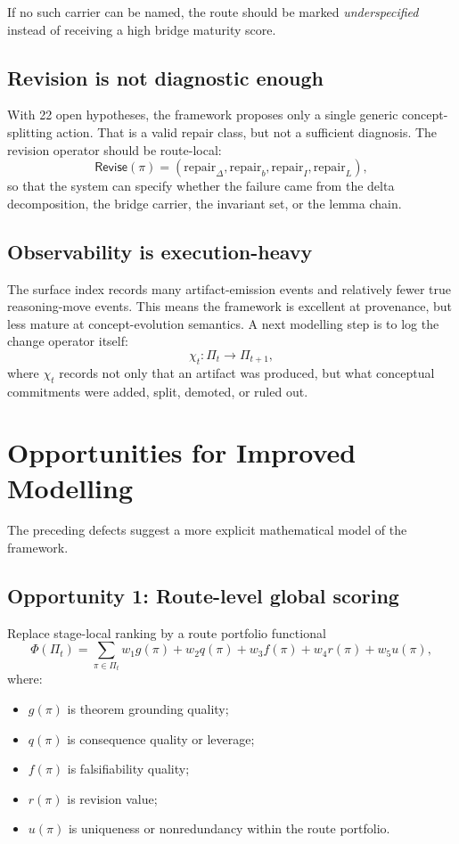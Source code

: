 \documentclass[11pt]{article}
\begin{document}
If no such carrier can be named, the route should be marked \emph{underspecified} instead of receiving a high bridge maturity score.

\subsection{Revision is not diagnostic enough}

With 22 open hypotheses, the framework proposes only a single generic concept-splitting action. That is a valid repair class, but not a sufficient diagnosis. The revision operator should be route-local:
\[
\mathsf{Revise}(\pi)
=
(\mathrm{repair}_{\Delta}, \mathrm{repair}_{b}, \mathrm{repair}_{I}, \mathrm{repair}_{L}),
\]
so that the system can specify whether the failure came from the delta decomposition, the bridge carrier, the invariant set, or the lemma chain.

\subsection{Observability is execution-heavy}

The surface index records many artifact-emission events and relatively fewer true reasoning-move events. This means the framework is excellent at provenance, but less mature at concept-evolution semantics. A next modelling step is to log the change operator itself:
\[
\chi_t : \Pi_t \rightarrow \Pi_{t+1},
\]
where $\chi_t$ records not only that an artifact was produced, but what conceptual commitments were added, split, demoted, or ruled out.

\section{Opportunities for Improved Modelling}

The preceding defects suggest a more explicit mathematical model of the framework.

\subsection{Opportunity 1: Route-level global scoring}

Replace stage-local ranking by a route portfolio functional
\[
\Phi(\Pi_t)
=
\sum_{\pi \in \Pi_t}
w_1 g(\pi)
+
w_2 q(\pi)
+
w_3 f(\pi)
+
w_4 r(\pi)
+
w_5 u(\pi),
\]
where:
\begin{itemize}[leftmargin=*,itemsep=0.2em]
\item $g(\pi)$ is theorem grounding quality;
\item $q(\pi)$ is consequence quality or leverage;
\item $f(\pi)$ is falsifiability quality;
\item $r(\pi)$ is revision value;
\item $u(\pi)$ is uniqueness or nonredundancy within the route portfolio.
\end{itemize}
\end{document}
